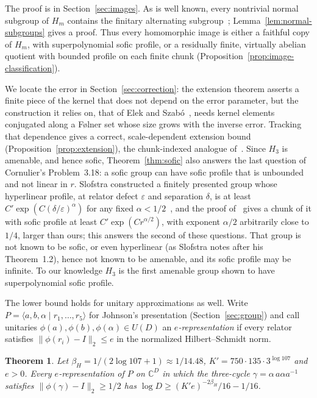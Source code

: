 \documentclass[11pt,a4paper]{article}
\theoremstyle{plain}
\newtheorem{theorem}{Theorem}[section]
\theoremstyle{definition}
\theoremstyle{remark}
\begin{document}
The proof is in Section~\ref{sec:images}. As is well known, every nontrivial normal subgroup of $H_m$ contains the finitary alternating
subgroup~\cite[proof of Proposition~5.5]{CGP07}; Lemma~\ref{lem:normal-subgroups} gives a proof. Thus every homomorphic image is either a
faithful copy of $H_m$, with superpolynomial sofic profile, or a residually finite, virtually abelian quotient with bounded profile on each
finite chunk (Proposition~\ref{prop:image-classification}).

We locate the error in Section~\ref{sec:correction}: the extension theorem asserts a finite piece of the kernel that does not depend on
the error parameter, but the construction it relies on, that of Elek and Szabó~\cite{ElekSzabo2006}, needs kernel elements conjugated
along a Følner set whose size grows with the inverse error. Tracking that dependence gives a correct, scale-dependent extension bound
(Proposition~\ref{prop:extension}), the chunk-indexed analogue of~\cite[Theorem~5.5]{ArzhantsevaCherix2020}. Since $H_3$ is
amenable, and hence sofic, Theorem~\ref{thm:sofic} also answers the last question of Cornulier's
Problem~3.18: a sofic group can have sofic profile that is unbounded and not linear in $r$. Slofstra constructed a finitely
presented group whose hyperlinear profile, at relator defect $\varepsilon$ and separation $\delta$, is at least
$C'\exp(C(\delta/\varepsilon)^{\alpha})$ for any fixed $\alpha<1/2$~\cite[Theorem~1.2]{Slofstra2018}, and the proof
of~\cite[Corollary~1.3]{Slofstra2018} gives a chunk of it with sofic profile at least $C'\exp(Cr^{\alpha/2})$, with exponent
$\alpha/2$ arbitrarily close to $1/4$, larger than ours; this answers the second of these questions. That group is not known to be sofic, or even hyperlinear (as
Slofstra notes after his Theorem~1.2), hence not known to be amenable, and its sofic profile may be infinite. To our knowledge $H_3$ is the
first amenable group shown to have superpolynomial sofic profile.

The lower bound holds for unitary approximations as well. Write $P=\langle a,b,\alpha\mid r_1,\dots,r_5\rangle$ for Johnson's
presentation (Section~\ref{sec:group}) and call unitaries $\phi(a),\phi(b),\phi(\alpha)\in U(D)$ an \emph{$e$-representation} if every
relator satisfies $\|\phi(r_i)-I\|_2\le e$ in the normalized Hilbert--Schmidt norm.

\begin{theorem}\label{thm:unitary}
Let $\beta_H=1/(2\log107+1)\approx1/14.48$, $K'=750\cdot135\cdot3^{\log107}$ and $e>0$. Every $e$-representation of $P$ on $\mathbb C^D$ in which the
three-cycle $\gamma=\alpha\,a\alpha a^{-1}$ satisfies $\|\phi(\gamma)-I\|_2\ge1/2$ has $\log D\ge(K'e)^{-2\beta_H}/16-1/16$.
\end{theorem}
\end{document}

